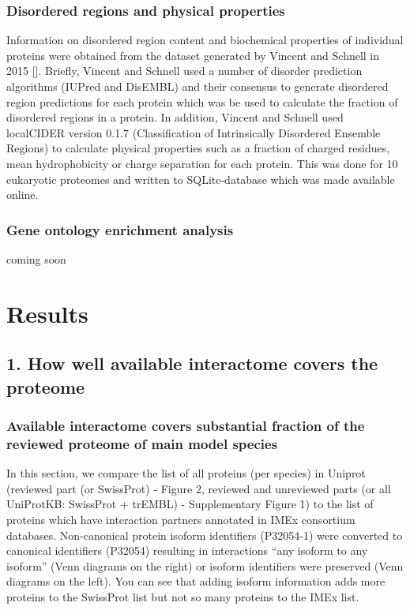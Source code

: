 \documentclass[]{article}
\begin{document}
\subsubsection{Disordered regions and physical
properties}\label{disordered-regions-and-physical-properties}

Information on disordered region content and biochemical properties of
individual proteins were obtained from the dataset generated by Vincent
and Schnell in 2015 {[}{]}. Briefly, Vincent and Schnell used a number
of disorder prediction algorithms (IUPred and DisEMBL) and their
consensus to generate disordered region predictions for each protein
which was be used to calculate the fraction of disordered regions in a
protein. In addition, Vincent and Schnell used localCIDER version 0.1.7
(Classification of Intrinsically Disordered Ensemble Regions) to
calculate physical properties such as a fraction of charged residues,
mean hydrophobicity or charge separation for each protein. This was done
for 10 eukaryotic proteomes and written to SQLite-database which was
made available online.

\subsubsection{Gene ontology enrichment
analysis}\label{gene-ontology-enrichment-analysis}

coming soon

\section{Results}\label{results}

\subsection{1. How well available interactome covers the
proteome}\label{how-well-available-interactome-covers-the-proteome}

\subsubsection{Available interactome covers substantial fraction of the
reviewed proteome of main model
species}\label{available-interactome-covers-substantial-fraction-of-the-reviewed-proteome-of-main-model-species}

In this section, we compare the list of all proteins (per species) in
Uniprot (reviewed part (or SwissProt) - Figure 2, reviewed and
unreviewed parts (or all UniProtKB: SwissProt + trEMBL) - Supplementary
Figure 1) to the list of proteins which have interaction partners
annotated in IMEx consortium databases. Non-canonical protein isoform
identifiers (P32054-1) were converted to canonical identifiers (P32054)
resulting in interactions ``any isoform to any isoform'' (Venn diagrams
on the right) or isoform identifiers were preserved (Venn diagrams on
the left). You can see that adding isoform information adds more
proteins to the SwissProt list but not so many proteins to the IMEx
list.
\end{document}
